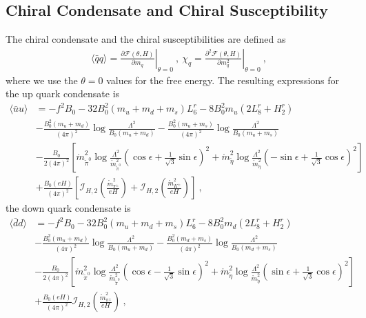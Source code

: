 \documentclass[12pt]{elsarticle}
\begin{document}
\subsection{Chiral Condensate and Chiral Susceptibility}
\label{sec:cc}
\noindent
The chiral condensate and the chiral susceptibilities are defined as 
\begin{equation}
\begin{split}
\langle\bar{q}q\rangle=\left.\frac{\partial \mathcal{F}(\theta,H)}{\partial m_{q}}\right|_{\theta=0}\ ,\ \chi_{q}=\left.\frac{\partial^{2} \mathcal{F}(\theta,H)}{\partial m_{q}^{2}}\right|_{\theta=0} \ ,
\end{split}
\end{equation}
where we use the $\theta=0$ values for the free energy. The resulting expressions for the up quark condensate is
\begin{equation}
\begin{split}
\label{eq:uu}
\langle\bar{u}u\rangle&=-f^{2}B_{0}-32B_{0}^{2}(m_{u}+m_{d}+m_{s})L^{r}_{6}-8B_{0}^{2}m_{u}(2L^{r}_{8}+H^{r}_{2})\\
&-\frac{B_{0}^{2}(m_{u}+m_{d})}{(4\pi)^{2}}\log\frac{\Lambda^{2}}{B_{0}(m_{u}+m_{d})}-\frac{B_{0}^{2}(m_{u}+m_{s})}{(4\pi)^{2}}\log\frac{\Lambda^{2}}{B_{0}(m_{u}+m_{s})}\\
&-\frac{B_{0}}{2(4\pi)^{2}}\left[\mathring{m}_{\tilde{\pi}^{0}}^{2}\log\frac{\Lambda^{2}}{\mathring{m}_{\tilde{\pi}^{0}}^{2}}(\cos\epsilon+\tfrac{1}{\sqrt{3}}\sin\epsilon)^{2}+\mathring{m}_{\tilde{\eta}}^{2}\log\frac{\Lambda^{2}}{\mathring{m}_{\tilde{\eta}}^{2}}(-\sin\epsilon+\tfrac{1}{\sqrt{3}}\cos\epsilon)^{2}\right]\\
&+\frac{B_{0}(eH)}{(4\pi)^{2}}\left[\mathcal{I}_{H,2}(\tfrac{\mathring{m}_{\pi^{\pm}}^{2}}{eH})+\mathcal{I}_{H,2}(\tfrac{\mathring{m}_{K^{\pm}}^{2}}{eH})\right]\ ,
\end{split}
\end{equation}
the down quark condensate is
\begin{equation}
\begin{split}
\label{eq:dd}
\langle\bar{d}d\rangle&=-f^{2}B_{0}-32B_{0}^{2}(m_{u}+m_{d}+m_{s})L^{r}_{6}-8B_{0}^{2}m_{d}(2L^{r}_{8}+H^{r}_{2})\\
&-\frac{B_{0}^{2}(m_{u}+m_{d})}{(4\pi)^{2}}\log\frac{\Lambda^{2}}{B_{0}(m_{u}+m_{d})}-\frac{B_{0}^{2}(m_{d}+m_{s})}{(4\pi)^{2}}\log\frac{\Lambda^{2}}{B_{0}(m_{d}+m_{s})}\\
&-\frac{B_{0}}{2(4\pi)^{2}}\left[\mathring{m}_{\tilde{\pi}^{0}}^{2}\log\frac{\Lambda^{2}}{\mathring{m}_{\tilde{\pi}^{0}}^{2}}(\cos\epsilon-\tfrac{1}{\sqrt{3}}\sin\epsilon)^{2}+\mathring{m}_{\tilde{\eta}}^{2}\log\frac{\Lambda^{2}}{\mathring{m}_{\tilde{\eta}}^{2}}(\sin\epsilon+\tfrac{1}{\sqrt{3}}\cos\epsilon)^{2}\right]\\
&+\frac{B_{0}(eH)}{(4\pi)^{2}}\mathcal{I}_{H,2}(\tfrac{\mathring{m}_{\pi^{\pm}}^{2}}{eH})\ ,
\end{split}
\end{equation}
\end{document}
